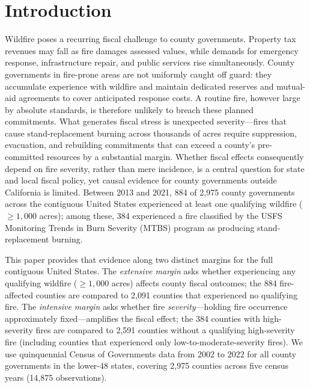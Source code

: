 \documentclass[12pt]{article}
\begin{document}
\newpage

\section{Introduction}

Wildfire poses a recurring fiscal challenge to county governments. Property tax
revenues may fall as fire damages assessed values, while demands for emergency
response, infrastructure repair, and public services rise simultaneously. County
governments in fire-prone areas are not uniformly caught off guard: they accumulate
experience with wildfire and maintain dedicated reserves and mutual-aid agreements
to cover anticipated response costs. A routine fire, however large by absolute
standards, is therefore unlikely to breach these planned commitments. What generates
fiscal stress is unexpected severity---fires that cause stand-replacement burning
across thousands of acres require suppression, evacuation, and rebuilding commitments
that can exceed a county's pre-committed resources by a substantial margin. Whether
fiscal effects consequently depend on fire severity, rather than mere incidence, is a
central question for state and local fiscal policy, yet causal evidence for county
governments outside California is limited. Between 2013 and 2021, 884 of 2,975
county governments across the contiguous United States experienced at least one
qualifying wildfire ($\geq\!1{,}000$ acres); among these, 384 experienced a fire
classified by the USFS Monitoring Trends in Burn Severity (MTBS) program as
producing stand-replacement burning.

This paper provides that evidence along two distinct margins for the full
contiguous United States. The \textit{extensive margin} asks whether experiencing
any qualifying wildfire ($\geq\!1{,}000$ acres) affects county fiscal outcomes;
the 884 fire-affected counties are compared to 2,091 counties that experienced
no qualifying fire. The \textit{intensive margin} asks whether fire
\textit{severity}---holding fire occurrence approximately fixed---amplifies the
fiscal effect; the 384 counties with high-severity fires are compared to 2,591
counties without a qualifying high-severity fire (including counties that
experienced only low-to-moderate-severity fires). We use quinquennial Census of Governments data from 2002 to 2022 for all county
governments in the lower-48 states, covering 2,975 counties across five census
years (14,875 observations).
\end{document}
